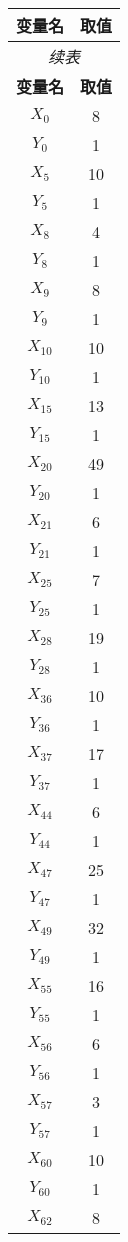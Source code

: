 \documentclass[a4paper,10pt]{article}
\begin{document}
\begin{center}
\begin{longtable}{cc}
\toprule
\textbf{变量名} & \textbf{取值} \\
\midrule
\endfirsthead
\multicolumn{2}{c}{\textit{续表}} \\
\toprule
\textbf{变量名} & \textbf{取值} \\
\midrule
\endhead
\bottomrule
\endfoot
\bottomrule
\endlastfoot
$X_{0}$ & 8 \\
$Y_{0}$ & 1 \\
$X_{5}$ & 10 \\
$Y_{5}$ & 1 \\
$X_{8}$ & 4 \\
$Y_{8}$ & 1 \\
$X_{9}$ & 8 \\
$Y_{9}$ & 1 \\
$X_{10}$ & 10 \\
$Y_{10}$ & 1 \\
$X_{15}$ & 13 \\
$Y_{15}$ & 1 \\
$X_{20}$ & 49 \\
$Y_{20}$ & 1 \\
$X_{21}$ & 6 \\
$Y_{21}$ & 1 \\
$X_{25}$ & 7 \\
$Y_{25}$ & 1 \\
$X_{28}$ & 19 \\
$Y_{28}$ & 1 \\
$X_{36}$ & 10 \\
$Y_{36}$ & 1 \\
$X_{37}$ & 17 \\
$Y_{37}$ & 1 \\
$X_{44}$ & 6 \\
$Y_{44}$ & 1 \\
$X_{47}$ & 25 \\
$Y_{47}$ & 1 \\
$X_{49}$ & 32 \\
$Y_{49}$ & 1 \\
$X_{55}$ & 16 \\
$Y_{55}$ & 1 \\
$X_{56}$ & 6 \\
$Y_{56}$ & 1 \\
$X_{57}$ & 3 \\
$Y_{57}$ & 1 \\
$X_{60}$ & 10 \\
$Y_{60}$ & 1 \\
$X_{62}$ & 8 \\

\end{longtable}
\end{center}
\end{document}
